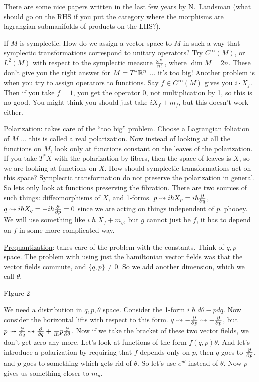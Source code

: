  There are some nice papers written in the last few years by N.~Landsman (what should
 go on the RHS if you put the category where the morphisms are lagrangian submanifolds
 of products on the LHS?).

 If $M$ is symplectic.  How do we assign a vector space to $M$ in such a way that
 symplectic transformations correspond to unitary operators?  Try $C^\infty(M)$, or
 $L^2(M)$ with respect to the symplectic measure $\frac{\omega^n}{n!}$, where $\dim M=2n$.
 These don't give you the right answer for $M=T^*\mathbb{R}^n$ ... it's too big!  Another
 problem is when you try to assign operators to functions.  Say $f\in C^\infty(M)$
 gives you $i\cdot X_f$.  Then if you take $f=1$, you get the operator 0, not
 multiplication by 1, so this is no good.  You might think you should just take
 $iX_f+m_f$, but this doesn't work either.

 \underline{Polarization}: takes care of the ``too big'' problem.  Choose a Lagrangian
 foliation of $M$ ... this is called a real polarization.  Now instead of looking at
 all the functions on $M$, look only at functions constant on the leaves of the
 polarization.  If you take $T^*X$ with the polarization by fibers, then the space of
 leaves is $X$, so we are looking at functions on $X$.  How should symplectic
 transformations act on this space?  Symplectic transformation do not preserve the
 polarization in general.  So lets only look at functions preserving the fibration.
 There are two sources of such things: diffeomorphisms of $X$, and 1-forms.
 $p\rightsquigarrow i\hslash X_p = i\hslash \frac{\partial }{\partial q}$, $q\rightsquigarrow i\hslash
 X_q = -i\hslash \frac{\partial }{\partial p} = 0$ since we are acting on things independent of $p$.
 phooey.  We will use something like $i\hslash X_f + m_{g}$, but $g$ cannot just be
 $f$, it has to depend on $f$ in some more complicated way.

 \underline{Prequantization}: takes care of the problem with the constants.  Think of
 $q,p$ space.  The problem with using just the hamiltonian vector fields was that the
 vector fields commute, and $\{q,p\}\neq 0$.  So we add another dimension, which we
 call $\theta$.

 FIgure 2

 We need a distribution in $q,p,\theta$ space.  Consider the 1-form $i\hslash d\theta-pdq$.
 Now consider the horizontal lifts with respect to this form.  $q\rightsquigarrow
 -\frac{\partial }{\partial p} \rightsquigarrow  -\frac{\partial }{\partial p}$, but $p\rightsquigarrow \frac{\partial }{\partial q}
 \rightsquigarrow \frac{\partial }{\partial q} + \frac{}{i\hslash} p \frac{\partial }{\partial \theta}$.  Now if we take
 the bracket of these two vector fields, we don't get zero any more.  Let's look at
 functions of the form $f(q,p)\theta$.  And let's introduce a polarization by
 requiring that $f$ depends only on $p$, then $q$ goes to $\frac{\partial }{\partial p}$, and $p$ goes
 to something which gets rid of $\theta$.  So let's use $e^{i\theta}$ instead of
 $\theta$.  Now $p$ gives us something closer to $m_p$.
